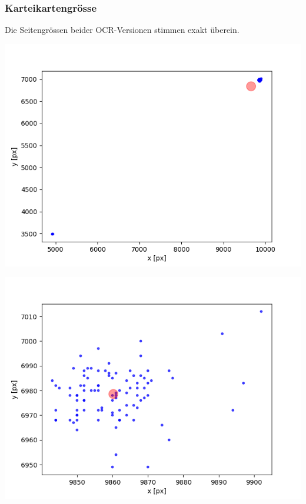 \subsubsection{Karteikartengrösse}

Die Seitengrössen beider OCR-Versionen stimmen exakt überein.

\begin{center}
\begin{minipage}[t]{0.45\textwidth}
\begin{center}
\includegraphics[scale=0.45]{Bilder/page_size.png}
\end{center}
\end{minipage}
\begin{minipage}[t]{0.45\textwidth}
\begin{center}
\includegraphics[scale=0.45]{Bilder/page_size_adjusted.png}
\end{center}
\end{minipage}
\end{center}

